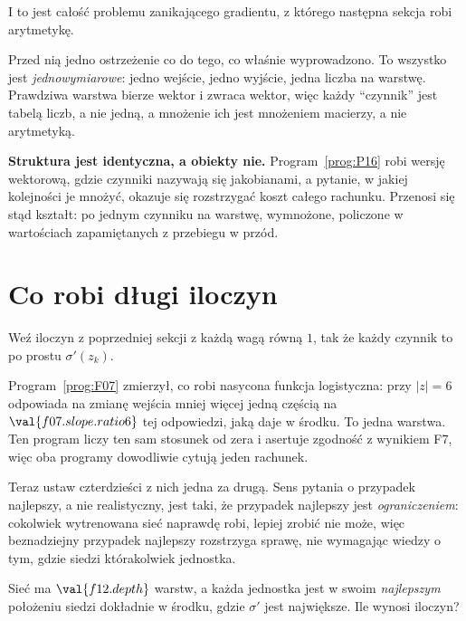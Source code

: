\begin{fr}
I to jest całość problemu zanikającego gradientu, z którego następna sekcja
robi arytmetykę.

Przed nią jedno ostrzeżenie co do tego, co właśnie wyprowadzono. To wszystko
jest \emph{jednowymiarowe}: jedno wejście, jedno wyjście, jedna liczba na
warstwę. Prawdziwa warstwa bierze wektor i zwraca wektor, więc każdy
\enquote{czynnik} jest tabelą liczb, a nie jedną, a mnożenie ich jest
mnożeniem macierzy, a nie arytmetyką.

\textbf{Struktura jest identyczna, a obiekty nie.}
Program~\ref{prog:P16} robi wersję wektorową, gdzie czynniki nazywają się
jakobianami, a pytanie, w jakiej kolejności je mnożyć, okazuje się
rozstrzygać koszt całego rachunku. Przenosi się stąd kształt: po jednym
czynniku na warstwę, wymnożone, policzone w wartościach zapamiętanych z
przebiegu w przód.
\end{fr}

\section{Co robi długi iloczyn}
\label{sec:F12-vanishing}

\begin{fr}
Weź iloczyn z poprzedniej sekcji z każdą wagą równą $1$, tak że każdy czynnik
to po prostu $\sigma'(z_k)$.

Program~\ref{prog:F07} zmierzył, co robi nasycona funkcja logistyczna: przy
$\lvert z \rvert = 6$ odpowiada na zmianę wejścia mniej więcej jedną częścią
na $\val{f07.slope.ratio6}$ tej odpowiedzi, jaką daje w środku. To jedna
warstwa. Ten program liczy ten sam stosunek od zera i asertuje zgodność z
wynikiem F7, więc oba programy dowodliwie cytują jeden rachunek.

Teraz ustaw czterdzieści z nich jedna za drugą. Sens pytania o przypadek
najlepszy, a nie realistyczny, jest taki, że przypadek najlepszy jest
\emph{ograniczeniem}: cokolwiek wytrenowana sieć naprawdę robi, lepiej zrobić
nie może, więc beznadziejny przypadek najlepszy rozstrzyga sprawę, nie
wymagając wiedzy o tym, gdzie siedzi którakolwiek jednostka.

Sieć ma $\val{f12.depth}$ warstw, a każda jednostka jest w swoim
\emph{najlepszym} położeniu \dash{} siedzi dokładnie w środku, gdzie $\sigma'$
jest największe. Ile wynosi iloczyn?
\dotline
\nextframe
\end{fr}

